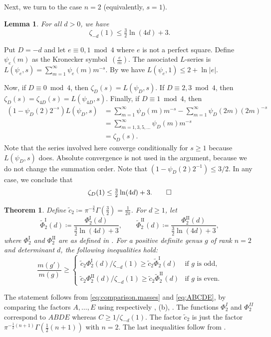 \documentclass[a4paper]{amsart}
\theoremstyle{definition}
\theoremstyle{plain}
\newtheorem{theorem}[definition]{Theorem}
\newtheorem{lemma}[definition]{Lemma}
\newcommand{\I}{\mathrm{I}}
\newcommand{\II}{\mathrm{II}}
\begin{document}
Next, we turn to the case \(n = 2\) (equivalently, \(s = 1\)).

\begin{lemma} \label{lem:bound.zeta_D}
For all \(d > 0\), we have
\[
    \zeta_{-d}(1) \leq \tfrac{3}{2} \ln(4d) + 3.
\]
\end{lemma}
\proof
Put \(D = -d\) and let \(e \equiv 0,1 \bmod 4\) where \(e\) is not a perfect square. 
Define \(\psi_e(m)\) as the Kronecker symbol~\(\left(\frac{e}{m} \right)\). The associated \(L\)-series is 
 \(L(\psi_e,s) = \sum_{m=1}^\infty \psi_e(m)m^{-s}\). 
By \cite[§12.14, Theorem~14.3]{hua} we have \(L(\psi_e,1) \leq 2 + \ln|e|\).

Now, if \(D\equiv 0 \bmod 4\), then \(\zeta_D(s) = L(\psi_D,s)\).
If \(D\equiv 2,3 \bmod 4\), then \(\zeta_D(s)=\zeta_{4D}(s) = L(\psi_{4D},s)\).
Finally, if \(D\equiv 1 \bmod 4\), then 
\begin{align*}
(1-\psi_D(2)2^{-s})L(\psi_{D},s)
    &= \sum_{m=1}^\infty \psi_{D}(m)m^{-s} - \sum_{m=1}^\infty \psi_{D}(2m)(2m)^{-s}\\
    &= \sum_{m=1,3,5,\ldots}^\infty \psi_{D}(m)m^{-s}\\
    &= \zeta_D(s).
\end{align*}
Note that the series involved here converge conditionally for $s\geq 1$ because $L(\psi_{D},s)$ does.
Absolute convergence is not used in the argument, because we do not change the summation order.
Note that \((1-\psi_D(2)2^{-1})\leq 3/2\).  
In any case, we conclude that
\[
\zeta_D(1) \leq \tfrac{3}{2} \ln(4d) + 3. \qedhere
\]
\endproof 

\begin{theorem} \label{thm:bound.rank.2}
Define \(\tilde c_2 \coloneqq \pi^{-\frac{3}{2}} \Gamma\left(\tfrac{3}{2}\right) = \tfrac{1}{2\pi}\). For \(d \geq 1\), let  
\[
\tilde{\Phi}_2^\I(d) \coloneqq \frac{\Phi_2^\I(d)}{\tfrac{3}{2} \ln(4d) + 3}, \qquad  
\tilde{\Phi}_2^\II(d) \coloneqq \frac{\Phi_2^\II(d)}{\tfrac{3}{2} \ln(4d) + 3},
\]  
where \(\Phi_2^\I\) and \(\Phi_2^\II\) are as defined in .  
For a positive definite genus \(g\) of rank \(n = 2\) and determinant \(d\), the following inequalities hold:  
\[
\frac{m(g')}{m(g)} \geq  
\begin{cases}  
\tilde c_2 \Phi_2^\I(d)/\zeta_{-d}(1) \geq \tilde c_2 \tilde{\Phi}_2^\I(d) & \text{if \(g\) is odd,} \\  
\tilde c_2 \Phi_2^\II(d)/\zeta_{-d}(1) \geq \tilde c_2 \tilde{\Phi}_2^\II(d) & \text{if \(g\) is even.}  
\end{cases}
\]
\end{theorem}
\proof
The statement follows from \eqref{eq:comparison.masses} and \eqref{eq:ABCDE}, by comparing the factors \(A,\ldots,E\) using respectively , 
(b), . 
The functions \(\Phi^I_2\) and \(\Phi^{II}_2\) correspond to \(ABDE\) whereas $C\geq 1/\zeta_{-d}(1)$. The factor \(\tilde c_2\) is just the factor \(\pi^{-\frac{1}{2}(n+1)}\Gamma(\frac{1}{2}(n+1))\) with \(n = 2\).
The last inequalities follow from .
\endproof
\end{document}
